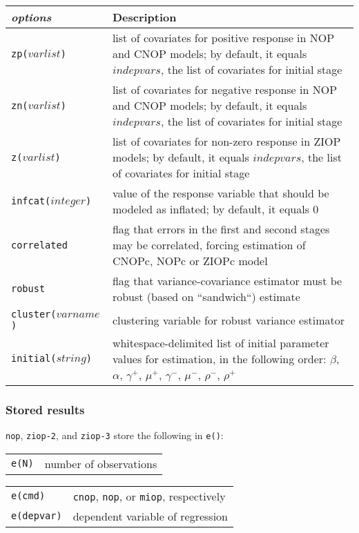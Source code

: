\documentclass[letterpaper,fleqn,12pt]{article}
\begin{document}
\begin{onehalfspace}
\begin{tabular}{lp{12cm}}
\textit{options} & Description \\ 
\midrule\texttt{zp($varlist$)} & list of covariates for positive response in
NOP and CNOP models; by default, it equals $indepvars$, the list of
covariates for initial stage \\ 
\texttt{zn($varlist$)} & list of covariates for negative response in NOP and
CNOP models; by default, it equals $indepvars$, the list of covariates for
initial stage \\ 
\texttt{z($varlist$)} & list of covariates for non-zero response in ZIOP
models; by default, it equals $indepvars$, the list of covariates for
initial stage \\ 
\texttt{infcat($integer$)} & value of the response variable that should be
modeled as inflated; by default, it equals 0 \\ 
\texttt{correlated} & flag that errors in the first and second stages may be
correlated, forcing estimation of CNOPc, NOPc or ZIOPc model \\ 
\texttt{robust} & flag that variance-covariance estimator must be robust
(based on \textquotedblleft sandwich\textquotedblleft ) estimate \\ 
\texttt{cluster($varname$)} & clustering variable for robust variance
estimator \\ 
\texttt{initial($string$)} & whitespace-delimited list of initial parameter
values for estimation, in the following order: $\beta $, $\alpha $, $\gamma
^{+}$, $\mu ^{+}$, $\gamma ^{-}$, $\mu ^{-}$, $\rho ^{-}$, $\rho ^{+}$%
\end{tabular}

\subsubsection*{Stored results}

\texttt{nop}, \texttt{ziop-2}, and \texttt{ziop-3} store the following in 
\texttt{e()}:


\begin{tabular}{p{3cm}p{12cm}}
\texttt{e(N)} & number of observations%
\end{tabular}


\begin{tabular}{p{3.12cm}p{12cm}}
\texttt{e(cmd)} & \texttt{cnop}, \texttt{nop}, or \texttt{miop}, respectively
\\ 
\texttt{e(depvar)} & dependent variable of regression%
\end{tabular}


\end{onehalfspace}
\end{document}
